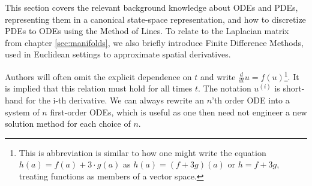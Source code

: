 \ifdefined\COMPILINGFROMMAIN
\else
    
    
\fi

This section covers the relevant background knowledge about ODEs and PDEs, representing them in a canonical state-space representation, and how to discretize PDEs to ODEs using the Method of Lines. To relate to the Laplacian matrix from chapter \ref{sec:manifolds}, we also briefly introduce Finite Difference Methods, used in Euclidean settings to approximate spatial derivatives.

Authors will often omit the explicit dependence on $t$ and write $\frac{d}{dt}u = f(u)$\footnote{This is abbreviation is similar to how one might write the equation $h(a) = f(a) + 3\cdot g(a)$ as $h(a) = (f+3g)(a)$ or $h = f+3g$, treating functions as members of a vector space.}. It is implied that this relation must hold for all times $t$.
The notation $u^{(i)}$ is short-hand for the i-th derivative. We can always rewrite an $n$'th order ODE into a system of $n$ first-order ODEs, which is useful as one then need not engineer a new solution method for each choice of $n$.
